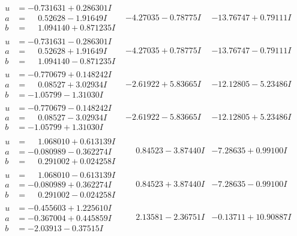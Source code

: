 \documentclass[1p]{elsarticle_modified}
\theoremstyle{definition}
\begin{document}
$$\begin{array}{c|c|c}
\begin{aligned}
u &= -0.731631 + 0.286301 I \\
a &= \phantom{-}0.52628 - 1.91649 I \\
b &= \phantom{-}1.094140 + 0.871235 I\end{aligned}
 & -4.27035 - 0.78775 I & -13.76747 + 0.79111 I \\ \hline\begin{aligned}
u &= -0.731631 - 0.286301 I \\
a &= \phantom{-}0.52628 + 1.91649 I \\
b &= \phantom{-}1.094140 - 0.871235 I\end{aligned}
 & -4.27035 + 0.78775 I & -13.76747 - 0.79111 I \\ \hline\begin{aligned}
u &= -0.770679 + 0.148242 I \\
a &= \phantom{-}0.08527 + 3.02934 I \\
b &= -1.05799 - 1.31030 I\end{aligned}
 & -2.61922 + 5.83665 I & -12.12805 - 5.23486 I \\ \hline\begin{aligned}
u &= -0.770679 - 0.148242 I \\
a &= \phantom{-}0.08527 - 3.02934 I \\
b &= -1.05799 + 1.31030 I\end{aligned}
 & -2.61922 - 5.83665 I & -12.12805 + 5.23486 I \\ \hline\begin{aligned}
u &= \phantom{-}1.068010 + 0.613139 I \\
a &= -0.080989 - 0.362274 I \\
b &= \phantom{-}0.291002 + 0.024258 I\end{aligned}
 & \phantom{-}0.84523 - 3.87440 I & -7.28635 + 0.99100 I \\ \hline\begin{aligned}
u &= \phantom{-}1.068010 - 0.613139 I \\
a &= -0.080989 + 0.362274 I \\
b &= \phantom{-}0.291002 - 0.024258 I\end{aligned}
 & \phantom{-}0.84523 + 3.87440 I & -7.28635 - 0.99100 I \\ \hline\begin{aligned}
u &= -0.455603 + 1.225610 I \\
a &= -0.367004 + 0.445859 I \\
b &= -2.03913 - 0.37515 I\end{aligned}
 & \phantom{-}2.13581 - 2.36751 I & -0.13711 + 10.90887 I \\ \hline\begin{aligned}

\end{aligned}
\end{array}$$
\end{document}
